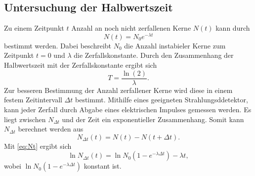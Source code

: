 \subsection{Untersuchung der Halbwertszeit}
Zu einem Zeitpunkt $t$ Anzahl an noch nicht zerfallenen Kerne $N(t)$ kann durch
\begin{equation}
    \label{eq:Nt}
    N(t) = N_0 e^{-\lambda t}
\end{equation}
bestimmt werden.
Dabei beschreibt $N_0$ die Anzahl instabieler Kerne zum Zeitpunkt $t = 0$ und $\lambda$ die Zerfallskonstante.
Durch den Zusammenhang der Halbwertszeit mit der Zerfallskonstante ergibt sich 
\begin{equation}
    \label{eq:T}
    T = \frac{\ln(2)}{\lambda}.
\end{equation}
Zur besseren Bestimmung der Anzahl zerfallener Kerne wird diese in einem festem Zeitintervall $\Delta t$ bestimmt.
Mithilfe eines geeigneten Strahlungsddetektor, kann jeder Zerfall durch Abgabe eines elektrischen Impulses gemessen werden.
Es liegt zwischen $N_{\Delta t}$ und der Zeit ein exponentieller Zusammenhang.
Somit kann $N_{\Delta t}$ berechnet werden aus
\begin{equation}
    N_{\Delta t}(t) = N(t) - N(t + \Delta t).
\end{equation}
Mit \ref{eq:Nt} ergibt sich
\begin{equation}
    \ln N_{\Delta t}(t) = \ln N_0(1 - e^{-\lambda \Delta t}) -\lambda t,
\end{equation}
wobei $\ln N_0(1 - e^{-\lambda \Delta t})$ konstant ist.


\cite{sample}
